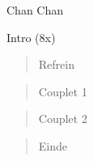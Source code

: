 \begin{song}[]{Chan Chan}

\begin{instrumental}{Intro (8x)}
   
\end{instrumental}

\begin{verse}{Refrein}
\end{verse}

\begin{verse}{Couplet 1}
\end{verse}


\begin{verse}{Couplet 2}
\end{verse}

\begin{verse}{Einde}
\end{verse}
\end{song}

\clearpage
\begin{translation}[]

\end{translation}

